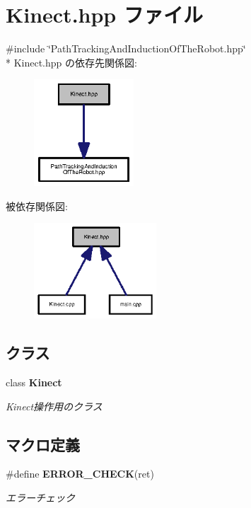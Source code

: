 \section{Kinect.\-hpp ファイル}
\label{_kinect_8hpp}
{\ttfamily \#include \char`\"{}Path\-Tracking\-And\-Induction\-Of\-The\-Robot.\-hpp\char`\"{}}\\*
Kinect.\-hpp の依存先関係図\-:\nopagebreak
\begin{figure}[H]
\begin{center}
\leavevmode
\includegraphics[width=106pt]{_kinect_8hpp__incl}
\end{center}
\end{figure}
被依存関係図\-:\nopagebreak
\begin{figure}[H]
\begin{center}
\leavevmode
\includegraphics[width=130pt]{_kinect_8hpp__dep__incl}
\end{center}
\end{figure}
\subsection*{クラス}
\begin{DoxyCompactItemize}
\item 
class {\bf Kinect}
\begin{DoxyCompactList}\small\item\em Kinect操作用のクラス \end{DoxyCompactList}\end{DoxyCompactItemize}
\subsection*{マクロ定義}
\begin{DoxyCompactItemize}
\item 
\#define {\bf E\-R\-R\-O\-R\-\_\-\-C\-H\-E\-C\-K}(ret)
\begin{DoxyCompactList}\small\item\em エラーチェック \end{DoxyCompactList}\end{DoxyCompactItemize}
